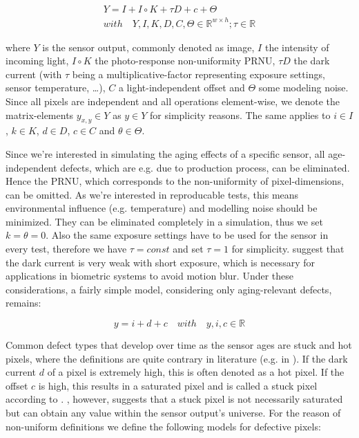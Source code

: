 \documentclass[10pt,twocolumn,letterpaper]{article}
\begin{document}
\begin{equation}
\begin{aligned}
 Y = I+I \circ K+\tau D +c+\Theta \\ with \quad Y,I,K,D,C, \Theta \in \mathbb{R}^{w \times h}; \tau \in \mathbb{R}
\end{aligned}
  \label{equ:pixelmodel}
 \end{equation}

where $Y$ is the sensor output, commonly denoted as image, $I$ the intensity of incoming light, $I \circ K$ the photo-response non-uniformity PRNU, $\tau D$ the dark current (with $\tau$ being a multiplicative-factor representing exposure settings, sensor temperature, \dots), $C$ a light-independent offset and $\Theta$ some modeling noise. Since all pixels are independent \cite{fridrich, defectDetection} and all operations element-wise, we denote the matrix-elements $y_{x,y} \in Y$ as $ y \in Y$ for simplicity reasons. The same applies to $i \in I$, $k \in K$, $d \in D$, $c \in C$ and $\theta \in \Theta$.

Since we're interested in simulating the aging effects of a specific sensor, all age-independent defects, which are e.g. due to production process, can be eliminated. Hence the PRNU, which corresponds to the non-uniformity of pixel-dimensions, can be omitted. As we're interested in reproducable tests, this means environmental influence (e.g. temperature) and modelling noise should be minimized. They can be eliminated completely in a simulation, thus we set $k=\theta=0$. Also the same exposure settings have to be used for the sensor in every test, therefore we have $\tau = const$ and set $ \tau = 1$ for simplicity. \cite{camAndDisplays, radiometricCCD,failureSemi,fridrich} suggest that the dark current is very weak with short exposure, which is necessary for applications in biometric systems to avoid motion blur. Under these considerations, a fairly simple model, considering only aging-relevant defects, remains:

\begin{equation}
  \label{equ:pixemodelEasier}
  y = i + d + c \quad with \quad y,i,c \in \mathbb{R}
\end{equation}

Common defect types that develop over time as the sensor ages are stuck and hot pixels, where the definitions are quite contrary in literature (e.g. in \cite{fridrich, defectIdentification, failureSemi}). If the dark current $d$ of a pixel is extremely high, this is often denoted as a hot pixel. If the offset $c$ is high, this results in a saturated pixel and is called a stuck pixel according to \cite{fridrich}. \cite{defectIdentification}, however, suggests that a stuck pixel is not necessarily saturated but can obtain any value within the sensor output's universe. For the reason of non-uniform definitions we define the following models for defective pixels:
\end{document}
